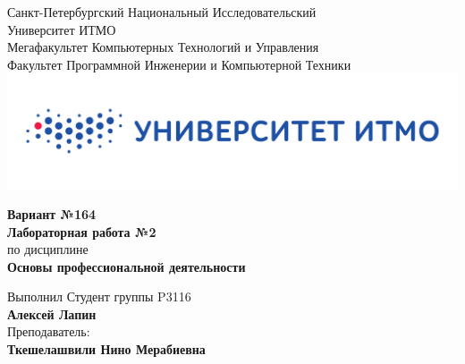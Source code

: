 \documentclass[12pt,onecolumn]{article}
\begin{document}
\setcounter{tocdepth}{4}
\begin{center}
    Санкт-Петербургский Национальный Исследовательский\\ 
    Университет ИТМО\\
    Мегафакультет Компьютерных Технологий и Управления\\
    Факультет Программной Инженерии и Компьютерной Техники \\
    \includegraphics[scale=0.3]{itm.jpg} %
\end{center}
\vspace{1cm}


\begin{center}
    \large \textbf{Вариант №164}\\
    \textbf{Лабораторная работа №2}\\
    по дисциплине\\
    \textbf{Основы профессиональной деятельности}
\end{center}

\vspace{2cm}

\begin{flushright}
  Выполнил Студент  группы P3116\\
  \textbf{Алексей Лапин}\\
  Преподаватель: \\
  \textbf{Ткешелашвили Нино Мерабиевна}\\
\end{flushright}
\end{document}
